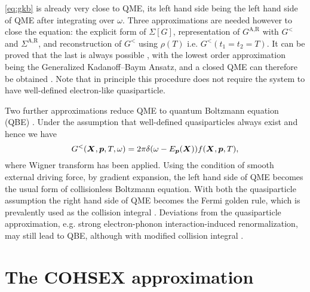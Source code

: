 \documentclass[hyperref, a4paper]{article}
\begin{document}
\eqref{eq:gkb} is already very close to QME,
its left hand side being the left hand side of QME 
after integrating over $\omega$.
Three approximations are needed however to close the equation:
the explicit form of $\Sigma[G]$,
representation of $G^{\text{A}, \text{R}}$ with $G^<$ and $\Sigma^{\text{A}, \text{R}}$,
and reconstruction of $G^<$ using $\rho(T)$ i.e. $G^<(t_1 = t_2 = T)$.
It can be proved that the last is always possible \cite{vspivcka2005long},
with the lowest order approximation being the 
Generalized Kadanoff–Baym Ansatz,
and a closed QME can therefore be obtained \cite{vspivcka2005long2,haug2008quantum}.
Note that in principle this procedure does not require 
the system to have well-defined electron-like quasiparticle.

Two further approximations reduce QME to quantum Boltzmann equation (QBE)
\cite{rammer1986quantum,haug2008quantum}.
Under the assumption that well-defined quasiparticles always exist and hence we have 
\begin{equation}
    G^<(\vb*{X}, \vb*{p}, T, \omega) = 2\pi \delta(\omega - E_{\vb*{p}}(\vb*{X})) f(\vb*{X}, \vb*{p}, T),
\end{equation}
where Wigner transform has been applied.
Using the condition of smooth external driving force,
by gradient expansion, the left hand side of QME becomes 
the usual form of collisionless Boltzmann equation.
With both the quasiparticle assumption the right hand side of QME 
becomes the Fermi golden rule, 
which is prevalently used as the collision integral \cite{chen2022first}.
Deviations from the quasiparticle approximation,
e.g. strong electron-phonon interaction-induced renormalization, 
may still lead to QBE,
although with modified collision integral \cite{rammer1986quantum,wais2018quantum}.

\section{The COHSEX approximation} 

\printbibliography
\end{document}
